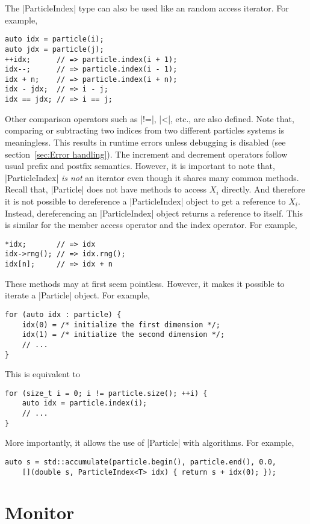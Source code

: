 The |ParticleIndex| type can also be used like an random access iterator. For
example,
\begin{verbatim}
auto idx = particle(i);
auto jdx = particle(j);
++idx;      // => particle.index(i + 1);
idx--;      // => particle.index(i - 1);
idx + n;    // => particle.index(i + n);
idx - jdx;  // => i - j;
idx == jdx; // => i == j;
\end{verbatim}
Other comparison operators such as |!=|, |<|, etc., are also defined. Note
that, comparing or subtracting two indices from two different particles systems
is meaningless. This results in runtime errors unless debugging is disabled
(see section~\ref{sec:Error handling}). The increment and decrement operators
follow usual prefix and postfix semantics. However, it is important to note
that, |ParticleIndex| \emph{is not} an iterator even though it shares many
common methods. Recall that, |Particle| does not have methods to access $X_i$
directly. And therefore it is not possible to dereference a |ParticleIndex|
object to get a reference to $X_i$. Instead, dereferencing an |ParticleIndex|
object returns a reference to itself. This is similar for the member access
operator and the index operator. For example,
\begin{verbatim}
*idx;       // => idx
idx->rng(); // => idx.rng();
idx[n];     // => idx + n
\end{verbatim}
These methods may at first seem pointless. However, it makes it possible to
iterate a |Particle| object. For example,
\begin{verbatim}
for (auto idx : particle) {
    idx(0) = /* initialize the first dimension */;
    idx(1) = /* initialize the second dimension */;
    // ...
}
\end{verbatim}
This is equivalent to
\begin{verbatim}
for (size_t i = 0; i != particle.size(); ++i) {
    auto idx = particle.index(i);
    // ...
}
\end{verbatim}
More importantly, it allows the use of |Particle| with algorithms. For example,
\begin{verbatim}
auto s = std::accumulate(particle.begin(), particle.end(), 0.0,
    [](double s, ParticleIndex<T> idx) { return s + idx(0); });
\end{verbatim}

\section{Monitor}
\label{sec:Monitor}

